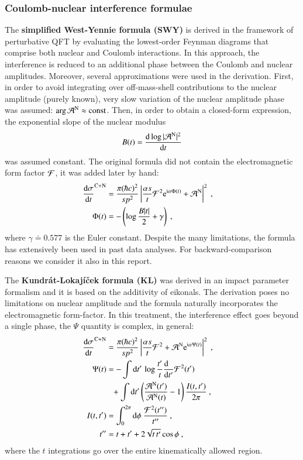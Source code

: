 \subsubsection{Coulomb-nuclear interference formulae}

The {\bf simplified West-Yennie formula (SWY)} \cite{wy68} is derived in the framework of perturbative QFT by evaluating the lowest-order Feynman diagrams that comprise both nuclear and Coulomb interactions. In this approach, the interference is reduced to an additional phase between the Coulomb and nuclear amplitudes. Moreover, several approximations were used in the derivation. First, in order to avoid integrating over off-mass-shell contributions to the nuclear amplitude (purely known), very slow variation of the nuclear amplitude phase was assumed: $\arg {\cal A}^{\rm N} \approx \hbox{const}$. Then, in order to obtain a closed-form expression, the exponential slope of the nuclear modulus
\begin{equation}
B(t) = {\d \log |{\cal A}^{\rm N}|^2 \over \d t}
\end{equation}
was assumed constant. The original formula did not contain the electromagnetic form factor ${\cal F}$, it was added later by hand:
\begin{equation}
\label{eq:int swy}
	\begin{aligned}
		{\d\sigma\over \d t}^{\rm C+N} &= {\pi (\hbar c)^2 \over s p^2} \left | {\alpha s\over t} {\cal F}^2 \e^{\I\alpha \Phi(t)} + {\cal A}^{\rm N} \right |^2\ ,\cr
		\Phi(t) &= - \left( \log {B |t|\over 2} + \gamma \right)\ ,\cr
	\end{aligned}
\end{equation}
where $\gamma \doteq 0.577$ is the Euler constant. Despite the many limitations, the formula has extensively been used in past data analyses. For backward-comparison reasons we consider it also in this report.

The {\bf Kundr\' at-Lokaj\' i\v cek formula (KL)} \cite{kl94} was derived in an impact parameter formalism and it is based on the additivity of eikonals. The derivation poses no limitations on nuclear amplitude and the formula naturally incorporates the electromagnetic form-factor. In this treatment, the interference effect goes beyond a single phase, the $\Psi$ quantity is complex, in general:
\begin{equation}
\label{eq:int kl}
	\begin{aligned}
		{\d\sigma\over \d t}^{\rm C+N} &= {\pi (\hbar c)^2 \over s p^2} \left | {\alpha s\over t} {\cal F}^2 + {\cal A}^{\rm N} \e^{\I\alpha \Psi(t)} \right |^2\ ,\cr
		\Psi(t) &= 
			- \int \d t'\, \log {t'\over t} {\d\phantom{t'}\over \d t'} {\cal F}^2(t') \cr
		&\phantom{=} + \int \d t' \left( {{\cal A}^{\rm N}(t') \over {\cal A}^{\rm N}(t)} - 1 \right) { I(t, t')\over 2\pi }
			\ ,\cr
		I(t, t') &= \int_0^{2\pi} \d\phi\ {{\cal F}^2(t'')\over t''}\ , \cr
		t'' &= t + t' + 2\sqrt{t\, t'} \cos\phi\ ,\cr
	\end{aligned}
\end{equation}
where the $t$ integrations go over the entire kinematically allowed region.

